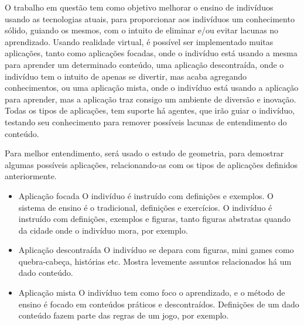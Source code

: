 \documentclass[12pt]{article}
\begin{document}
\hspace*{5mm}
        O trabalho em questão tem como objetivo melhorar o ensino de indivíduos usando as tecnologias atuais, para proporcionar aos indivíduos um conhecimento sólido, guiando os mesmos, com o intuito de eliminar e/ou evitar lacunas no aprendizado. Usando realidade virtual, é possível ser implementado muitas aplicações, tanto como aplicações focadas, onde o indivíduo está usando a mesma para aprender um determinado conteúdo, uma aplicação descontraída, onde o indivíduo tem o intuito de apenas se divertir, mas acaba agregando conhecimentos, ou uma aplicação mista, onde o indivíduo está usando a aplicação para aprender, mas a aplicação traz consigo um ambiente de diversão e inovação. Todas os tipos de aplicações, tem suporte há agentes, que irão guiar o indivíduo, testando seu conhecimento para remover possíveis lacunas de entendimento do conteúdo.

        Para melhor entendimento, será usado o estudo de geometria, para demostrar algumas possíveis aplicações, relacionando-as com os tipos de aplicações definidos anteriormente.

        \begin{itemize}
            \item Aplicação focada
            \subitem O indivíduo é instruído com definições e exemplos. O sistema de ensino é o tradicional, definições e exercícios.
            \subitem O indivíduo é instruído com definições, exemplos e figuras, tanto figuras abstratas quando da cidade onde o indivíduo mora, por exemplo.
            \item Aplicação descontraída
            \subitem O indivíduo se depara com figuras, mini games como quebra-cabeça, histórias etc. Mostra levemente assuntos relacionados há um dado conteúdo.
            \item Aplicação mista
            \subitem O indivíduo tem como foco o aprendizado, e o método de ensino é focado em conteúdos práticos e descontraídos. Definições de um dado conteúdo fazem parte das regras de um jogo, por exemplo.
        \end{itemize}
\end{document}
